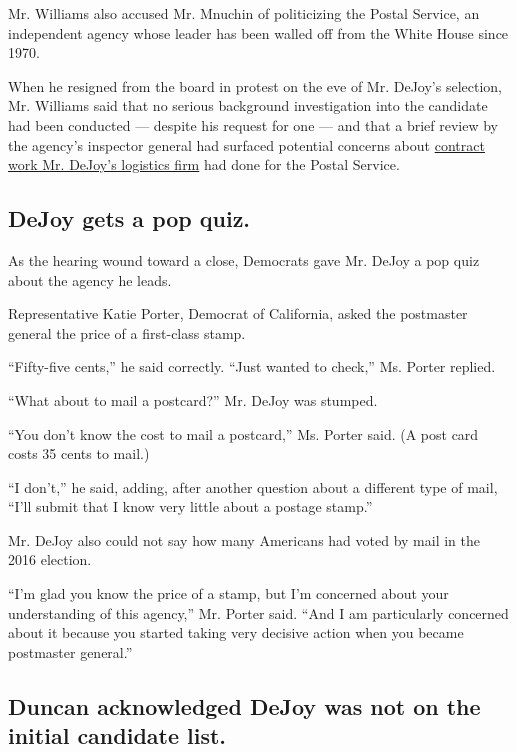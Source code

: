 Mr. Williams also accused Mr. Mnuchin of politicizing the Postal
Service, an independent agency whose leader has been walled off from the
White House since 1970.

When he resigned from the board in protest on the eve of Mr. DeJoy's
selection, Mr. Williams said that no serious background investigation
into the candidate had been conducted --- despite his request for one
--- and that a brief review by the agency's inspector general had
surfaced potential concerns about
\href{https://www.nytimes3xbfgragh.onion/2020/08/17/us/politics/dejoy-postal-service-mail-in-voting.html}{contract
work Mr. DeJoy's logistics firm} had done for the Postal Service.

\hypertarget{dejoy-gets-a-pop-quiz}{%
\subsection{DeJoy gets a pop quiz.}\label{dejoy-gets-a-pop-quiz}}

As the hearing wound toward a close, Democrats gave Mr. DeJoy a pop quiz
about the agency he leads.

Representative Katie Porter, Democrat of California, asked the
postmaster general the price of a first-class stamp.

``Fifty-five cents,'' he said correctly. ``Just wanted to check,'' Ms.
Porter replied.

``What about to mail a postcard?'' Mr. DeJoy was stumped.

``You don't know the cost to mail a postcard,'' Ms. Porter said. (A post
card costs 35 cents to mail.)

``I don't,'' he said, adding, after another question about a different
type of mail, ``I'll submit that I know very little about a postage
stamp.''

Mr. DeJoy also could not say how many Americans had voted by mail in the
2016 election.

``I'm glad you know the price of a stamp, but I'm concerned about your
understanding of this agency,'' Mr. Porter said. ``And I am particularly
concerned about it because you started taking very decisive action when
you became postmaster general.''

\hypertarget{duncan-acknowledged-dejoy-was-not-on-the-initial-candidate-list}{%
\subsection{Duncan acknowledged DeJoy was not on the initial candidate
list.}\label{duncan-acknowledged-dejoy-was-not-on-the-initial-candidate-list}}


